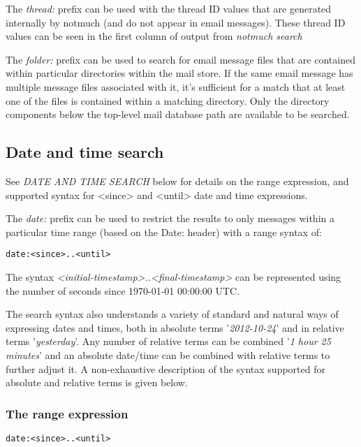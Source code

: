 \documentclass[a4,onecolumn,portrait]{article}
\begin{document}
The \emph{thread:} prefix can be used with the thread ID values that are generated internally by notmuch (and do not appear in email messages).  These thread ID values can be seen in the first column of output from \emph{notmuch search}

The \emph{folder:} prefix can be used to search for email message files that are contained within particular directories within the mail store. If the same email message has multiple message files associated with it, it's sufficient for a match that at least one of the files is contained within a matching directory. Only the directory components below the top-level mail database path are available to be searched.

\subsection{Date and time search}
\label{sec-8-3}

See \emph{DATE AND TIME SEARCH} below for details on the range expression,
and supported syntax for <since> and <until> date and time expressions.

The \emph{date:} prefix can be used to restrict the results to only messages within a particular time range (based on the Date: header) with a range syntax of:

\begin{verbatim}
date:<since>..<until>
\end{verbatim}

The syntax \emph{<initial-timestamp>..<final-timestamp>} can be represented using the number of seconds since 1970-01-01 00:00:00 UTC.

The search syntax also understands a variety of standard and natural ways of expressing dates and times, both in absolute terms '\emph{2012-10-24}' and in relative terms '\emph{yesterday}'. Any number of relative terms can be combined '\emph{1 hour 25 minutes}' and an absolute date/time can be combined with relative terms to further adjust it. A non-exhaustive description of the syntax supported for absolute and relative terms is given below.

\subsubsection{The range expression}
\label{sec-8-3-1}

\begin{verbatim}
date:<since>..<until>
\end{verbatim}
\end{document}
